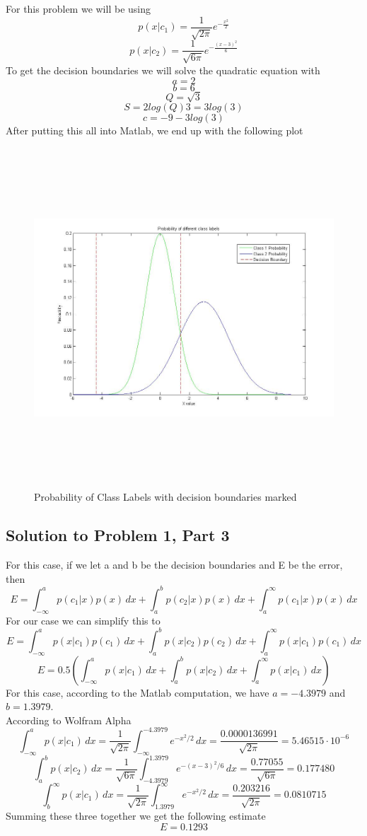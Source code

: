\documentclass[11pt,psfig]{article}
\begin{document}
For this problem we will be using
\[
p(x|c_1) = \frac{1}{\sqrt{2\pi}} e^{- \frac{x^2}{2}}
\]
\[
p(x|c_2) = \frac{1}{\sqrt{6\pi}} e^{- \frac{(x-3)^2}{6}}
\]
To get the decision boundaries we will solve the quadratic equation with
\[
a = 2
\]
\[
b = 6
\]
\[
Q = \sqrt{3}
\]
\[
S = 2 log(Q) 3 = 3log(3)
\]
\[
c = -9 - 3 log(3)
\]
After putting this all into Matlab, we end up with the following plot
\begin{figure}[H]
\centering
\includegraphics[height=5in]{prob1plot.jpg}
\caption{Probability of Class Labels with decision boundaries marked}
\end{figure}

\subsection*{Solution to Problem 1, Part 3}

For this case, if we let a and b be the decision boundaries and E be the error, then
\[
E = \int_{-\infty}^{a}{p(c_1|x)p(x) \, dx} + \int_{a}^{b}{p(c_2|x)p(x) \, dx} + \int_{a}^{\infty}{p(c_1|x)p(x) \, dx}
\]
For our case we can simplify this to
\[
E = \int_{-\infty}^{a}{p(x|c_1)p(c_1) \, dx} + \int_{a}^{b}{p(x|c_2)p(c_2) \, dx} + \int_{a}^{\infty}{p(x|c_1)p(c_1) \, dx}
\]
\[
E = 0.5(\int_{-\infty}^{a}{p(x|c_1) \, dx} + \int_{a}^{b}{p(x|c_2) \, dx} + \int_{a}^{\infty}{p(x|c_1) \, dx})
\]
For this case, according to the Matlab computation, we have $a=-4.3979$ and $b=1.3979$. \\
According to Wolfram Alpha
\[
\int_{-\infty}^{a}{p(x|c_1) \, dx} = \frac{1}{\sqrt{2\pi}} \int_{-\infty}^{-4.3979}{e^{-x^2/2} \, dx} = \frac{0.0000136991}{\sqrt{2\pi}} = 5.46515 \cdot 10^{-6}
\]
\[
\int_{a}^{b}{p(x|c_2) \, dx} = \frac{1}{\sqrt{6\pi}} \int_{-4.3979}^{1.3979}{e^{-(x-3)^2/6} \, dx} = \frac{0.77055}{\sqrt{6\pi}} = 0.177480
\]
\[
\int_{b}^{\infty}{p(x|c_1) \, dx} = \frac{1}{\sqrt{2\pi}} \int_{1.3979}^{\infty}{e^{-x^2/2} \, dx} = \frac{0.203216}{\sqrt{2\pi}} = 0.0810715
\]
Summing these three together we get the following estimate
\[
E = 0.1293
\]
\end{document}
